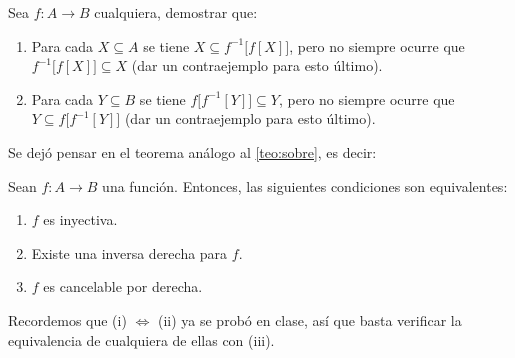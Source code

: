 \documentclass[letterpaper,DIV=14,headsepline,12pt]{scrartcl}
\begin{document}
    \begin{ejercicio}
        Sea $f:A \to B$ cualquiera, demostrar que:
        \begin{enumerate}
            \item Para cada $X \subseteq A$ se tiene $X \subseteq f^{-1}\big[ f[X] \big]$, pero no siempre ocurre que $f^{-1}\big[ f[X] \big] \subseteq X$ (dar un contraejemplo para esto último).
            \item Para cada $Y \subseteq B$ se tiene $f\big[ f^{-1}[Y] \big] \subseteq Y$, pero no siempre ocurre que $Y \subseteq f\big[ f^{-1}[Y] \big]$ (dar un contraejemplo para esto último).
        \end{enumerate}
    \end{ejercicio}

    Se dejó pensar en el teorema análogo al \autoref{teo:sobre}, es decir:
    \begin{ejercicio}
        Sean $f:A \to B$ una función. Entonces, las siguientes condiciones son equivalentes:
        \begin{enumerate}
            \item $f$ es inyectiva.
            \item Existe una inversa derecha para $f$.
            \item $f$ es cancelable por derecha.
        \end{enumerate}

        Recordemos que (i) $\Leftrightarrow$ (ii) ya se probó en clase, así que basta verificar la equivalencia de cualquiera de ellas con (iii).
    \end{ejercicio}




    
    
\end{document}
